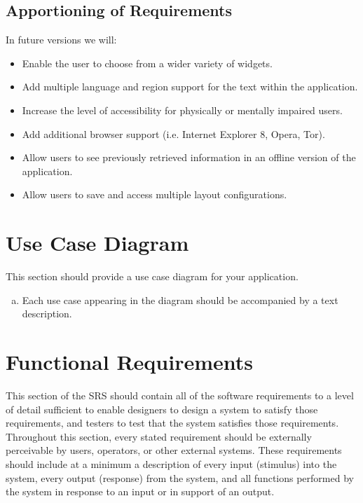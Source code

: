 \documentclass[]{article}
\begin{document}
\subsection{Apportioning of Requirements}
\label{sub:apportioning_of_requirements}
In future versions we will:  
\begin{itemize}
    \item Enable the user to choose from a wider variety of widgets.
    \item Add multiple language and region support for the text within the application.
    \item Increase the level of accessibility for physically or mentally impaired users.
    \item Add additional browser support (i.e. Internet Explorer 8, Opera, Tor).
    \item Allow users to see previously retrieved information in an offline version of the application.
    \item Allow users to save and access multiple layout configurations.
\end{itemize}


\section{Use Case Diagram}
\label{sec:use_case_diagram}
This section should provide a use case diagram for your application. 
\begin{enumerate}[a)]
	\item Each use case appearing in the diagram should be accompanied by a text description. 
\end{enumerate}

\section{Functional Requirements}
\label{sec:functional_requirements}
This section of the SRS should contain all of the software requirements to a level of detail sufficient to enable designers to design a system to satisfy those requirements, and testers to test that the system satisfies those requirements. Throughout this section, every stated requirement should be externally perceivable by users, operators, or other external systems. These requirements should include at a minimum a description of every input (stimulus) into the system, every output (response) from the system, and all functions performed by the system in response to an input or in support of an output.
\end{document}
